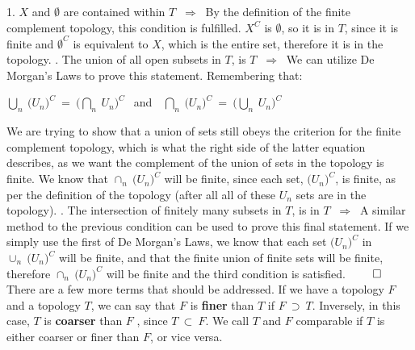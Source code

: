 \documentclass{article}
\begin{document}
1. $X$ and $\emptyset$ are contained within $T$ $ \ \Rightarrow \ $ By the definition of the finite complement topology, this condition is fulfilled. $X^{C}$ is $\emptyset$, so it is in $T$, since it is finite and $\emptyset^{C}$ is equivalent to $X$, which is the entire set, therefore it is in the topology.
\newline{}. The union of all open subsets in $T$, is $T$ $ \ \Rightarrow \ $ We can utilize De Morgan's Laws to prove this statement. Remembering that: \newline\newline
\begin{center}
$\displaystyle\bigcup_{n} \ \big(U_{n}\big)^{C} \ = \ \Bigg(\displaystyle\bigcap_{n} \ U_{n}\Bigg)^{C} \ \ $ and $\ \ \ \displaystyle\bigcap_{n} \ \big(U_{n}\big)^{C} \ = \ \Bigg(\displaystyle\bigcup_{n} \ U_{n}\Bigg)^{C}$
\end{center}
We are trying to show that a union of sets still obeys the criterion for the finite complement topology, which is what the right side of the latter equation describes, as we want the complement of the union of sets in the topology is finite. We know that $\displaystyle\cap_{n} \ \big(U_{n}\big)^{C}$ will be finite, since each set, $\big(U_{n}\big)^{C}$, is finite, as per the definition of the topology (after all all of these $U_n$ sets are in the topology). \newline{}. The intersection of finitely many subsets in $T$, is in $T$ $ \ \Rightarrow \ $ A similar method to the previous condition can be used to prove this final statement. If we simply use the first of De Morgan's Laws, we know that each set $\big(U_{n}\big)^{C}$ in $\displaystyle\cup_{n} \ \big(U_{n}\big)^{C}$ will be finite, and that the finite union of finite sets will be finite, therefore $\displaystyle\cap_{n} \ \big(U_{n}\big)^{C}$ will be finite and the third condition is satisfied.
\newline\newline
\hspace*{\fill} $\qed$
\newline\newline
There are a few more terms that should be addressed. If we have a topology $F$ and a topology $T$, we can say that $F$ is \textbf{finer} than $T$ if $F \ \supset \ T$. Inversely, in this case, $T$ is \textbf{coarser} than $F$ , since $T \ \subset \ F$. We call $T$ and $F$ comparable if $T$ is either coarser or finer than $F$, or vice versa.
\newline
\end{document}
